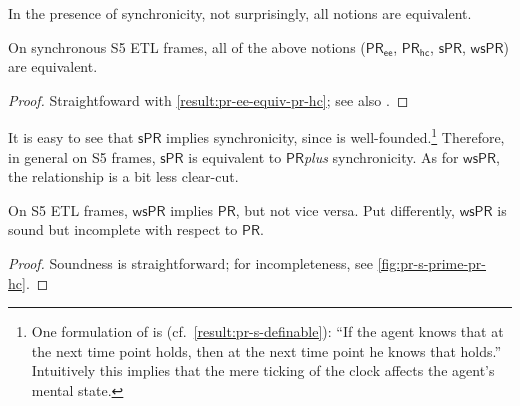 \documentclass{article}
\newcommand{\PR}{\ensuremath{\mathsf{PR}}\xspace}
\newcommand{\PRs}{\ensuremath{\mathsf{sPR}}\xspace}
\newcommand{\PRsprime}{\ensuremath{\mathsf{wsPR}}\xspace}
\newcommand{\PRhc}{\ensuremath{\mathsf{PR_{hc}}}\xspace}
\newcommand{\PRee}{\ensuremath{\mathsf{PR_{ee}}}\xspace}
\newcounter{#1}
\begin{document}
\medskip

In the presence of synchronicity, not surprisingly, all notions are equivalent.

\begin{proposition}
  \label{result:sync-pr-ee-equiv-pr-s}
  On synchronous S5 ETL frames, all of the above notions (\PRee, \PRhc, \PRs, \PRsprime) are equivalent.
\end{proposition}
\begin{proof}
  Straightfoward with \cref{result:pr-ee-equiv-pr-hc};
  see also \cite{halpern_complete_2004,van_der_meyden_complete_2003}.
\end{proof}

It is easy to see that \PRs implies synchronicity,
since  is well-founded.\footnote{One formulation of  is (cf.~\cref{result:pr-s-definable}):
``If the agent knows that at the next time point  holds, then at the next time point he knows that  holds.''
Intuitively this implies that the mere ticking of the clock affects the agent's mental state.}
Therefore, in general on S5 frames, \PRs is equivalent to \PR \emph{plus} synchronicity.
As for \PRsprime, the relationship is a bit less clear-cut.

\begin{proposition}
  On S5 ETL frames, \PRsprime implies \PR, but not vice versa.
  Put differently, \PRsprime is sound but incomplete with respect to \PR.
\end{proposition}
\begin{proof}
  Soundness is straightforward;
  for incompleteness, see \cref{fig:pr-s-prime-pr-hc}.
\end{proof}
\end{document}
